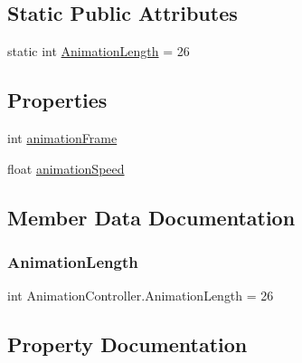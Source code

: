 \subsection*{Static Public Attributes}
\begin{DoxyCompactItemize}
\item 
static int \mbox{\hyperlink{class_animation_controller_a0bbb9c9004069afb3c2ac4600cbd79fc}{Animation\+Length}} = 26
\end{DoxyCompactItemize}
\subsection*{Properties}
\begin{DoxyCompactItemize}
\item 
int \mbox{\hyperlink{class_animation_controller_a97a1baad1d6f5f5e48145cad30ec8d16}{animation\+Frame}}
\item 
float \mbox{\hyperlink{class_animation_controller_a9a5d475137de1a9cb890396d404104a4}{animation\+Speed}}
\end{DoxyCompactItemize}


\subsection{Member Data Documentation}
\mbox{\label{class_animation_controller_a0bbb9c9004069afb3c2ac4600cbd79fc}} 
\subsubsection{\texorpdfstring{AnimationLength}{AnimationLength}}
{\footnotesize\ttfamily int Animation\+Controller.\+Animation\+Length = 26\hspace{0.3cm}{\ttfamily [static]}}



\subsection{Property Documentation}
\mbox{\label{class_animation_controller_a97a1baad1d6f5f5e48145cad30ec8d16}} 

